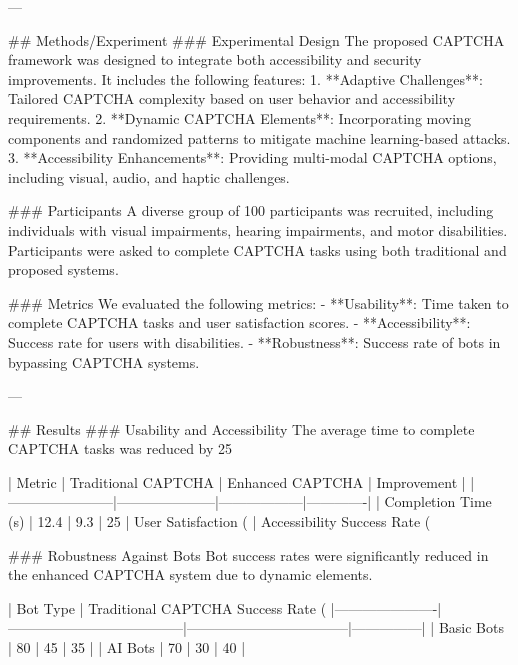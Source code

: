 ---

## Methods/Experiment
### Experimental Design
The proposed CAPTCHA framework was designed to integrate both accessibility and security improvements. It includes the following features:
1. **Adaptive Challenges**: Tailored CAPTCHA complexity based on user behavior and accessibility requirements.
2. **Dynamic CAPTCHA Elements**: Incorporating moving components and randomized patterns to mitigate machine learning-based attacks.
3. **Accessibility Enhancements**: Providing multi-modal CAPTCHA options, including visual, audio, and haptic challenges.

### Participants
A diverse group of 100 participants was recruited, including individuals with visual impairments, hearing impairments, and motor disabilities. Participants were asked to complete CAPTCHA tasks using both traditional and proposed systems.

### Metrics
We evaluated the following metrics:
- **Usability**: Time taken to complete CAPTCHA tasks and user satisfaction scores.
- **Accessibility**: Success rate for users with disabilities.
- **Robustness**: Success rate of bots in bypassing CAPTCHA systems.

---

## Results
### Usability and Accessibility
The average time to complete CAPTCHA tasks was reduced by 25%

| Metric                | Traditional CAPTCHA | Enhanced CAPTCHA | Improvement |
|-----------------------|---------------------|------------------|-------------|
| Completion Time (s)   | 12.4               | 9.3              | 25%
| User Satisfaction (%
| Accessibility Success Rate (%

### Robustness Against Bots
Bot success rates were significantly reduced in the enhanced CAPTCHA system due to dynamic elements.

| Bot Type             | Traditional CAPTCHA Success Rate (%
|----------------------|--------------------------------------|-----------------------------------|---------------|
| Basic Bots           | 80                                   | 45                                | 35            |
| AI Bots              | 70                                   | 30                                | 40            |

